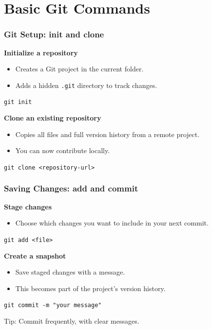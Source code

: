 \documentclass[aspectratio=169]{beamer}
\begin{document}
\section{Basic Git Commands}

\begin{frame}
  \frametitle{Git Setup: init and clone}

  \textbf{Initialize a repository}
  \begin{itemize}
    \item Creates a Git project in the current folder.
    \item Adds a hidden \texttt{.git} directory to track changes.
  \end{itemize}
  \vspace{0.3em}
  \texttt{git init}

  \vspace{1em}
  \textbf{Clone an existing repository}
  \begin{itemize}
    \item Copies all files and full version history from a remote project.
    \item You can now contribute locally.
  \end{itemize}
  \vspace{0.3em}
  \texttt{git clone <repository-url>}

\end{frame}

\begin{frame}
  \frametitle{Saving Changes: add and commit}

  \textbf{Stage changes}
  \begin{itemize}
    \item Choose which changes you want to include in your next commit.
  \end{itemize}
  \vspace{0.3em}
  \texttt{git add <file>}

  \vspace{1em}
  \textbf{Create a snapshot}
  \begin{itemize}
    \item Save staged changes with a message.
    \item This becomes part of the project's version history.
  \end{itemize}
  \vspace{0.3em}
  \texttt{git commit -m "your message"}

  \vspace{1em}
  Tip: Commit frequently, with clear messages.
\end{frame}
\end{document}
